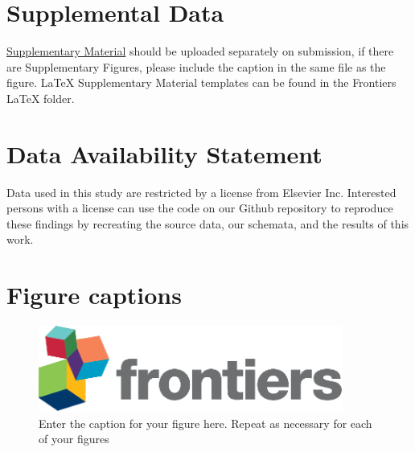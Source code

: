 \documentclass[utf8]{frontiersSCNS}
\begin{document}
{\section*{Supplemental Data}
 \href{http://home.frontiersin.org/about/author-guidelines#SupplementaryMaterial}{Supplementary Material} should be uploaded separately on submission, if there are Supplementary Figures, please include the caption in the same file as the figure. LaTeX Supplementary Material templates can be found in the Frontiers LaTeX folder.

\section*{Data Availability Statement}
Data used in this study are restricted by a license from Elsevier Inc. Interested persons with a license can use the code on our Github repository to reproduce these findings by recreating the source data, our schemata, and the results of this work.

 


\section*{Figure captions}


\begin{figure}[h!]
\begin{center}
\includegraphics[width=10cm]{logo1}%
\end{center}
\caption{ Enter the caption for your figure here.  Repeat as  necessary for each of your figures}\label{fig:1}
\end{figure}

}
\end{document}
